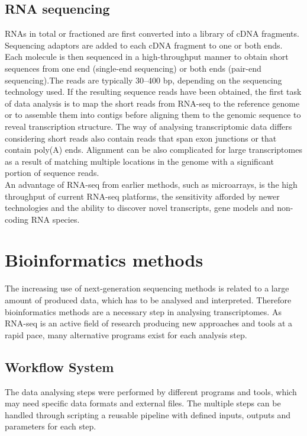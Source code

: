 \documentclass[12pt, a4paper]{report}
\begin{document}
\subsection{RNA sequencing}
RNAs in total or fractioned are first converted into a library of cDNA fragments. Sequencing adaptors are added to each cDNA fragment to one or both ends. Each molecule is then sequenced in a high-throughput manner to obtain short sequences from one end (single-end sequencing) or both ends (pair-end sequencing).The reads are typically 30–400 bp, depending on the sequencing technology used. If the resulting sequence reads have been obtained, the first task of data analysis is to map the short reads from RNA-seq to the reference genome or to assemble them into contigs before aligning them to the genomic sequence to reveal transcription structure. The way of analysing transcriptomic data differs considering short reads also contain reads that span exon junctions or that contain poly(A) ends. Alignment can be also complicated for large transcriptomes as a result of matching multiple locations in the genome with a significant portion of sequence reads. \cite{Wang2010} \\
An advantage of RNA-seq from earlier methods, such as microarrays, is the high throughput of current RNA-seq platforms, the sensitivity afforded by newer technologies and the ability to discover novel transcripts, gene models and non-coding RNA species. \cite{Korpelainen2014} \\

\section{Bioinformatics methods}
The increasing use of next-generation sequencing methods is related to a large amount of produced data, which has to be analysed and interpreted. Therefore bioinformatics methods are a necessary step in analysing transcriptomes. As RNA-seq is an active field of research producing new approaches and tools at a rapid pace, many alternative programs exist for each analysis step. \cite{Korpelainen2014}

\subsection{Workflow System}
The data analysing steps were performed by different programs and tools, which may need specific data formats and external files. The multiple steps can be handled through scripting a reusable pipeline with defined inputs, outputs and parameters for each step. 
\end{document}
